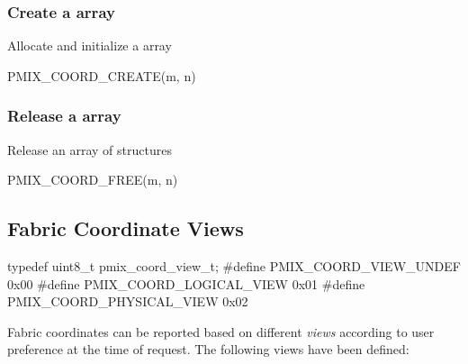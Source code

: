 \subsubsection{Create a  array}

Allocate and initialize a  array

\cspecificstart
\begin{codepar}
PMIX_COORD_CREATE(m, n)
\end{codepar}
\cspecificend

\begin{arglist}
\end{arglist}

\subsubsection{Release a  array}

Release an array of  structures

\cspecificstart
\begin{codepar}
PMIX_COORD_FREE(m, n)
\end{codepar}
\cspecificend

\begin{arglist}
\end{arglist}


\subsection{Fabric Coordinate Views}

\cspecificstart
\begin{codepar}
typedef uint8_t pmix_coord_view_t;
#define PMIX_COORD_VIEW_UNDEF       0x00
#define PMIX_COORD_LOGICAL_VIEW     0x01
#define PMIX_COORD_PHYSICAL_VIEW    0x02
\end{codepar}
\cspecificend

Fabric coordinates can be reported based on different \emph{views} according to user preference at the time of request. The following views have been defined:

